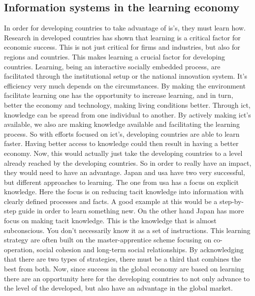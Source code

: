 \subsection{Information systems in the learning economy}
\label{infolearnec}
In order for developing countries to take advantage of \gls{is}'s, they must learn how.
Research in developed countries has shown that learning is a critical factor for economic success.
This is not just critical for firms and industries, but also for regions and countries.
This makes learning a crucial factor for developing countries. 
Learning, being an interactive socially embedded process, are facilitated through the institutional setup or the national innovation system. It's efficiency very much depends on the circumstances.
By making the environment facilitate learning one has the opportunity to increase learning, and in turn, better the economy and technology, making living conditions better. 
Through \gls{ict}, knowledge can be spread from one individual to another. 
By actively making \gls{ict}'s available, we also are making knowledge available and facilitating the learning process. 
So with efforts focused on \gls{ict}'s, developing countries are able to learn faster.
Having better access to knowledge could then result in having a better economy.
Now, this would actually just take the developing countries to a level already reached by the developing countries. 
So in order to really have an impact, they would need to have an advantage. 
Japan and \gls{usa} have two very successful, but different approaches to learning. 
The one from \gls{usa} has a focus on explicit knowledge. 
Here the focus is on reducing tacit knowledge into information with clearly defined processes and facts. 
A good example at this would be a step-by-step guide in order to learn something new. 
On the other hand Japan has more focus on making tacit knowledge. 
This is the knowledge that is almost subconscious. 
You don't necessarily know it as a set of instructions. 
This learning strategy are often built on the master-apprentice scheme focusing on co-operation, social cohesion and long-term social relationships. 
By acknowledging that there are two types of strategies, there must be a third that combines the best from both. 
Now, since success in the global economy are based on learning there are an opportunity here for the developing countries to not only advance to the level of the developed, but also have an advantage in the global market.

\cite{gedi:erik}





